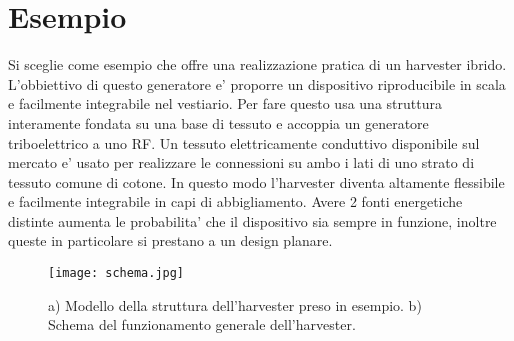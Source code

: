 \chapter{Esempio}
    Si sceglie come esempio \cite{kouWearableAllFabricHybrid2024} che offre una realizzazione pratica di un harvester ibrido. L'obbiettivo di questo generatore e' proporre un dispositivo riproducibile in scala e facilmente integrabile nel vestiario. Per fare questo usa una struttura interamente fondata su una base di tessuto e accoppia un generatore triboelettrico a uno RF. Un tessuto elettricamente conduttivo disponibile sul mercato e' usato per realizzare le connessioni su ambo i lati di uno strato di tessuto comune di cotone. In questo modo l'harvester diventa altamente flessibile e facilmente integrabile in capi di abbigliamento. Avere 2 fonti energetiche distinte aumenta le probabilita' che il dispositivo sia sempre in funzione, inoltre queste in particolare si prestano a un design planare.
    
    \begin{figure}[H]
        \texttt{[image: schema.jpg]}
        \centering
        \caption{a) Modello della struttura dell'harvester preso in esempio. b) Schema del funzionamento generale dell'harvester.\cite{kouWearableAllFabricHybrid2024}}
        \label{fig:schema}
    \end{figure}

